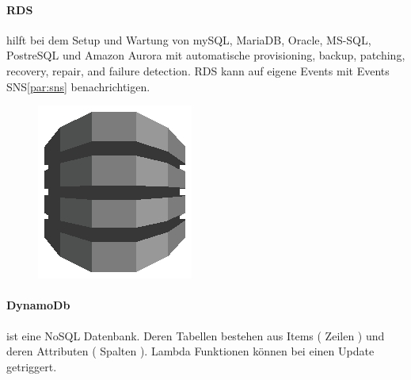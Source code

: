 \documentclass[
12pt,
english,
ngerman,
headsepline,
twoside,
openright,
numbers=noenddot,version=first
]{scrreprt}
\begin{document}
\paragraph{\acrfull{RDS}} hilft bei dem Setup und Wartung von mySQL, MariaDB, Oracle, MS-SQL, PostreSQL und Amazon Aurora mit automatische provisioning, backup, patching, recovery, repair, and failure detection. RDS kann auf eigene Events mit Events SNS\ref{par:sns} benachrichtigen.


\begin{figure}
	\includegraphics[width=0.9\linewidth]{./pics/aws/Database_GRAYSCALE_AmazonDynamoDB.eps}
\end{figure}
\paragraph{DynamoDb} ist eine NoSQL Datenbank. Deren Tabellen bestehen aus Items ( Zeilen ) und deren Attributen ( Spalten ). Lambda Funktionen können bei einen Update getriggert. 

\end{document}
